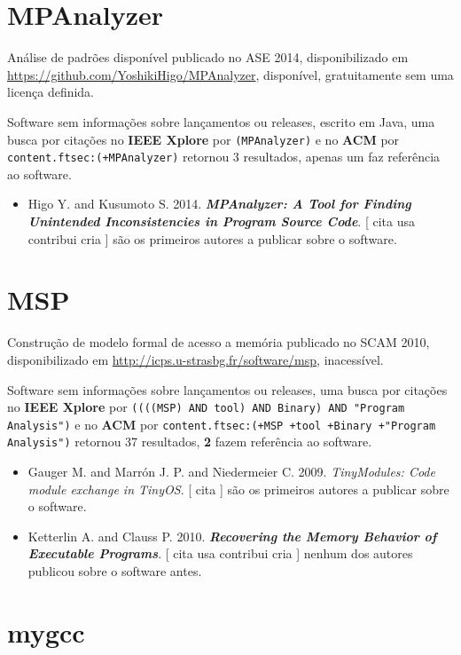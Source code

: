 \section{MPAnalyzer}

Análise de padrões disponível
publicado no ASE 2014,
disponibilizado em \url{https://github.com/YoshikiHigo/MPAnalyzer},
disponível,
gratuitamente
sem uma licença definida.

Software sem informações sobre lançamentos ou releases,
escrito em Java,
uma busca por citações no {\bf IEEE Xplore} por
\texttt{(MPAnalyzer)}
e no {\bf ACM} por
\texttt{content.ftsec:(+MPAnalyzer)}
retornou
3 resultados,
apenas um faz referência ao software.

\begin{itemize}
\item Higo Y. and Kusumoto S.
      2014.
        \textbf{\textit{ MPAnalyzer: A Tool for Finding Unintended Inconsistencies in Program Source Code}}.
      [
          cita
          usa
          contribui
          cria
      ]
são os primeiros autores a publicar sobre o software.
\end{itemize}
\section{MSP}

Construção de modelo formal de acesso a memória
publicado no SCAM 2010,
disponibilizado em \url{http://icps.u-strasbg.fr/software/msp},
inacessível.

Software sem informações sobre lançamentos ou releases,
uma busca por citações no {\bf IEEE Xplore} por
\texttt{((((MSP) AND tool) AND Binary) AND "Program Analysis")}
e no {\bf ACM} por
\texttt{content.ftsec:(+MSP +tool +Binary +"Program Analysis")}
retornou
37 resultados,
{\bf 2} fazem referência ao software.

\begin{itemize}
\item Gauger M. and Marrón J. P. and Niedermeier C.
      2009.
        \textit{ TinyModules: Code module exchange in TinyOS}.
      [
          cita
      ]
são os primeiros autores a publicar sobre o software.
\item Ketterlin A. and Clauss P.
      2010.
        \textbf{\textit{ Recovering the Memory Behavior of Executable Programs}}.
      [
          cita
          usa
          contribui
          cria
      ]
nenhum dos autores publicou sobre o software antes.
\end{itemize}
\section{mygcc}

